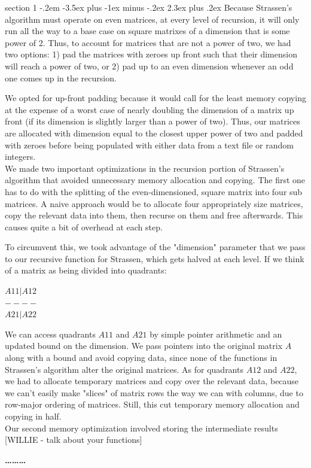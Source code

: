 \documentclass[12pt]{article}
\makeatletter
\newenvironment{problem}{\@startsection
       {section}
       {1}
       {-.2em}
       {-3.5ex plus -1ex minus -.2ex}
       {2.3ex plus .2ex}
       {\pagebreak[3]%
       \large\bf\noindent{Problem }
       }
       }
       {%
       \begin{center}\large\bf \ldots\ldots\ldots\end{center}}
\makeatother
\begin{document}
\begin{problem}{}
Because Strassen's algorithm must operate on even matrices, at every level of recursion, it will only run all the way to a base case on square matrixes of a dimension that is some power of 2.  Thus, to account for matrices that are not a power of two, we had two options: 1) pad the matrices with zeroes up front such that their dimension will reach a power of two, or 2) pad up to an even dimension whenever an odd one comes up in the recursion.  

We opted for up-front padding because it would call for the least memory copying at the expense of a worst case of nearly doubling the dimension of a matrix up front (if its dimension is slightly larger than a power of two).  Thus, our matrices are allocated with dimension equal to the closest upper power of two and padded with zeroes before being populated with either data from a text file or random integers.\\

We made two important optimizations in the recursion portion of Strassen's algorithm that avoided unnecessary memory allocation and copying.  The first one has to do with the splitting of the even-dimensioned, square matrix into four sub matrices.  A naive approach would be to allocate four appropriately size matrices, copy the relevant data into them, then recurse on them and free afterwards.  This causes quite a bit of  overhead at each step.

To circumvent this, we took advantage of the "dimension" parameter that we pass to our recursive function for Strassen, which gets halved at each level.  If we think of a matrix as being divided into quadrants:
\begin{center}
$A11 | A12$\\
$----$\\
$A21 | A22$
\end{center}
We can access quadrants $A11$ and $A21$ by simple pointer arithmetic and an updated bound on the dimension.  We pass pointers into the original matrix $A$ along with a bound and avoid copying data, since none of the functions in Strassen's algorithm alter the original matrices.  As for quadrants $A12$ and $A22$, we had to allocate temporary matrices and copy over the relevant data, because we can't easily make "slices" of matrix rows the way we can with columns, due to row-major ordering of matrices.   Still, this cut temporary memory allocation and copying in half.\\

Our second memory optimization involved storing the intermediate results [WILLIE - talk about your functions] \\


\end{problem}
\end{document}
